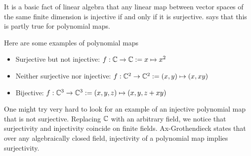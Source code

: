 It is a basic fact of linear algebra that any linear map
between vector spaces of the same finite dimension is
injective if and only if it is surjective.
 says that this is
partly true for polynomial maps.

Here are some examples of polynomial maps
\begin{itemize}
  \item Surjective but not injective: $f : \mathbb{C} \to \mathbb{C} := x \mapsto x^{2}$
  \item Neither surjective nor injective:
      $f : \mathbb{C}^{2} \to \mathbb{C}^{2} := (x,y) \mapsto (x,xy)$
  \item Bijective:
      $f : \mathbb{C}^{3} \to \mathbb{C}^{3} := (x,y,z) \mapsto ( x , y , z + xy )$
\end{itemize}

One might try very hard to look for an example of an injective polynomial map
that is not surjective.
Replacing $\mathbb{C}$ with an arbitrary field, we notice that
surjectivity and injectivity coincide on finite fields.
Ax-Grothendieck states that over any algebraically closed field,
injectivity of a polynomial map implies surjectivity.
